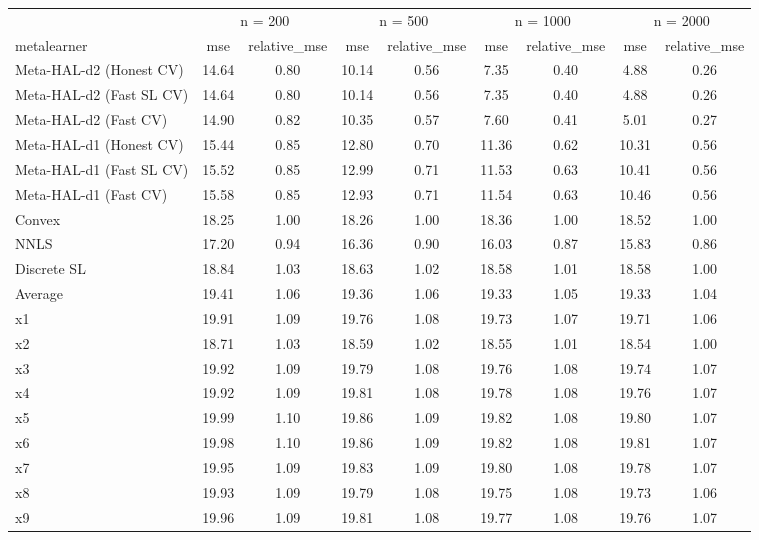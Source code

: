 
\begin{tabular}{lcccccccc}
\toprule
\multicolumn{1}{c}{ } & \multicolumn{2}{c}{n = 200} & \multicolumn{2}{c}{n = 500} & \multicolumn{2}{c}{n = 1000} & \multicolumn{2}{c}{n = 2000} \\
\cmidrule(l{3pt}r{3pt}){2-3} \cmidrule(l{3pt}r{3pt}){4-5} \cmidrule(l{3pt}r{3pt}){6-7} \cmidrule(l{3pt}r{3pt}){8-9}
metalearner & mse & relative\_mse & mse & relative\_mse & mse & relative\_mse & mse & relative\_mse\\
\midrule
Meta-HAL-d2 (Honest CV) & 14.64 & 0.80 & 10.14 & 0.56 & 7.35 & 0.40 & 4.88 & 0.26\\
Meta-HAL-d2 (Fast SL CV) & 14.64 & 0.80 & 10.14 & 0.56 & 7.35 & 0.40 & 4.88 & 0.26\\
Meta-HAL-d2 (Fast CV) & 14.90 & 0.82 & 10.35 & 0.57 & 7.60 & 0.41 & 5.01 & 0.27\\
Meta-HAL-d1 (Honest CV) & 15.44 & 0.85 & 12.80 & 0.70 & 11.36 & 0.62 & 10.31 & 0.56\\
Meta-HAL-d1 (Fast SL CV) & 15.52 & 0.85 & 12.99 & 0.71 & 11.53 & 0.63 & 10.41 & 0.56\\
Meta-HAL-d1 (Fast CV) & 15.58 & 0.85 & 12.93 & 0.71 & 11.54 & 0.63 & 10.46 & 0.56\\
Convex & 18.25 & 1.00 & 18.26 & 1.00 & 18.36 & 1.00 & 18.52 & 1.00\\
NNLS & 17.20 & 0.94 & 16.36 & 0.90 & 16.03 & 0.87 & 15.83 & 0.86\\
Discrete SL & 18.84 & 1.03 & 18.63 & 1.02 & 18.58 & 1.01 & 18.58 & 1.00\\
Average & 19.41 & 1.06 & 19.36 & 1.06 & 19.33 & 1.05 & 19.33 & 1.04\\
x1 & 19.91 & 1.09 & 19.76 & 1.08 & 19.73 & 1.07 & 19.71 & 1.06\\
x2 & 18.71 & 1.03 & 18.59 & 1.02 & 18.55 & 1.01 & 18.54 & 1.00\\
x3 & 19.92 & 1.09 & 19.79 & 1.08 & 19.76 & 1.08 & 19.74 & 1.07\\
x4 & 19.92 & 1.09 & 19.81 & 1.08 & 19.78 & 1.08 & 19.76 & 1.07\\
x5 & 19.99 & 1.10 & 19.86 & 1.09 & 19.82 & 1.08 & 19.80 & 1.07\\
x6 & 19.98 & 1.10 & 19.86 & 1.09 & 19.82 & 1.08 & 19.81 & 1.07\\
x7 & 19.95 & 1.09 & 19.83 & 1.09 & 19.80 & 1.08 & 19.78 & 1.07\\
x8 & 19.93 & 1.09 & 19.79 & 1.08 & 19.75 & 1.08 & 19.73 & 1.06\\
x9 & 19.96 & 1.09 & 19.81 & 1.08 & 19.77 & 1.08 & 19.76 & 1.07\\

\end{tabular}
